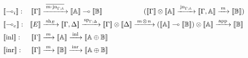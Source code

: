 \begin{align*}
    &\hspace{-20pt}\llbracket \multimap_i \rrbracket : & \llbracket \Gamma \rrbracket  & \xrightarrow{\hspace{2pt} \overline{m \cdot \text{jn}_{\Gamma;\mathbb{A}}}  \hspace{2pt}}  \llbracket \mathbb{A} \rrbracket \multimap \llbracket \mathbb{B} \rrbracket  \hspace{60pt} (\llbracket \Gamma \rrbracket \otimes \llbracket \mathbb{A} \rrbracket  \xrightarrow{\hspace{2pt} \text{jn}_{\Gamma; \mathbb{A}} \hspace{2pt}} \llbracket \Gamma, \mathbb{A} \rrbracket  \xrightarrow{\hspace{2pt} m \hspace{2pt}}  \llbracket \mathbb{B} \rrbracket )\\
    &\hspace{-20pt}\llbracket \multimap_e \rrbracket : & [\![E]\!] & \xrightarrow{\hspace{2pt}\text{sh}_{E}\hspace{2pt}}   [\![\Gamma,\Delta ]\!]   \xrightarrow{\hspace{1pt}\text{sp}_{\Gamma;\Delta}\hspace{1pt}}  [\![\Gamma ]\!] \otimes [\![\Delta ]\!]  \xrightarrow{\hspace{2pt} m \hspace{1pt} \otimes \hspace{1pt} n \hspace{2pt}} (\llbracket \mathbb{A} \rrbracket \multimap \llbracket \mathbb{B} \rrbracket) \otimes \llbracket \mathbb{A} \rrbracket  \xrightarrow{\hspace{2pt} \text{app} \hspace{2pt}} \llbracket \mathbb{B} \rrbracket \\
    & \hspace{-20pt}\llbracket \text{inl} \rrbracket : & [\![\Gamma]\!] & \xrightarrow{\hspace{2pt} m \hspace{2pt}} \llbracket \mathbb{A} \rrbracket \xrightarrow{\hspace{2pt}\inl \hspace{2pt}} \llbracket \typeA \oplus \typeB \rrbracket\\
    &\hspace{-20pt}\llbracket \text{inr} \rrbracket : & [\![\Gamma]\!] & \xrightarrow{\hspace{2pt} m \hspace{2pt}} \llbracket \mathbb{B} \rrbracket \xrightarrow{\hspace{2pt}\inr \hspace{2pt}} \llbracket \typeA \oplus \typeB \rrbracket\\

\end{align*}
